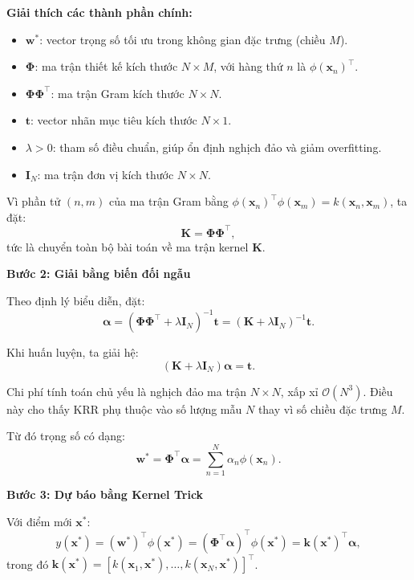 \textbf{Giải thích các thành phần chính:}
\begin{itemize} [labelsep=10pt, leftmargin=2cm]
    \item $\mathbf{w}^*$: vector trọng số tối ưu trong không gian đặc trưng (chiều $M$).
    \item $\mathbf{\Phi}$: ma trận thiết kế kích thước $N\times M$, với hàng thứ $n$ là $\phi(\mathbf{x}_n)^\top$.
    \item $\mathbf{\Phi}\mathbf{\Phi}^\top$: ma trận Gram kích thước $N\times N$.
    \item $\mathbf{t}$: vector nhãn mục tiêu kích thước $N\times 1$.
    \item $\lambda>0$: tham số điều chuẩn, giúp ổn định nghịch đảo và giảm overfitting.
    \item $\mathbf{I}_N$: ma trận đơn vị kích thước $N\times N$.
\end{itemize}

Vì phần tử $(n,m)$ của ma trận Gram bằng
$\phi(\mathbf{x}_n)^\top\phi(\mathbf{x}_m)=k(\mathbf{x}_n,\mathbf{x}_m)$,
ta đặt:
\begin{equation}
    \mathbf{K}=\mathbf{\Phi}\mathbf{\Phi}^\top,
\end{equation}
tức là chuyển toàn bộ bài toán về ma trận kernel $\mathbf{K}$.

\textbf{Bước 2: Giải bằng biến đối ngẫu}

Theo định lý biểu diễn, đặt:
\begin{equation}
    \boldsymbol{\alpha}=(\mathbf{\Phi}\mathbf{\Phi}^\top+\lambda\mathbf{I}_N)^{-1}\mathbf{t}
    =(\mathbf{K}+\lambda\mathbf{I}_N)^{-1}\mathbf{t}.
\end{equation}

Khi huấn luyện, ta giải hệ:
\begin{equation}
    (\mathbf{K}+\lambda\mathbf{I}_N)\boldsymbol{\alpha}=\mathbf{t}.
\end{equation}

Chi phí tính toán chủ yếu là nghịch đảo ma trận $N\times N$, xấp xỉ $\mathcal{O}(N^3)$.
Điều này cho thấy KRR phụ thuộc vào số lượng mẫu $N$ thay vì số chiều đặc trưng $M$.

Từ đó trọng số có dạng:
\begin{equation}
    \mathbf{w}^*=\mathbf{\Phi}^\top\boldsymbol{\alpha}
    =\sum_{n=1}^{N}\alpha_n\phi(\mathbf{x}_n).
\end{equation}

\textbf{Bước 3: Dự báo bằng Kernel Trick}

Với điểm mới $\mathbf{x}^*$:
\begin{equation}
    y(\mathbf{x}^*)=(\mathbf{w}^*)^\top\phi(\mathbf{x}^*)
    =(\mathbf{\Phi}^\top\boldsymbol{\alpha})^\top\phi(\mathbf{x}^*)
    =\mathbf{k}(\mathbf{x}^*)^\top\boldsymbol{\alpha},
\end{equation}
trong đó
$\mathbf{k}(\mathbf{x}^*)=[k(\mathbf{x}_1,\mathbf{x}^*),\ldots,k(\mathbf{x}_N,\mathbf{x}^*)]^\top$.

